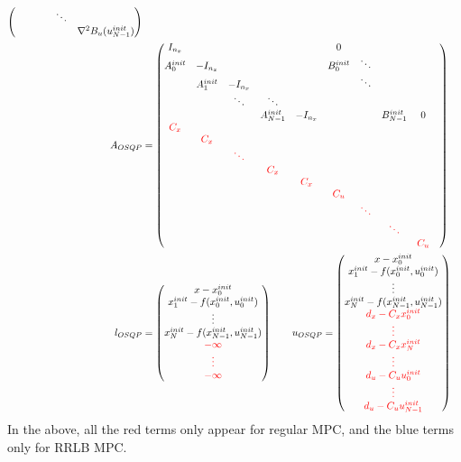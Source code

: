 \documentclass[12pt]{article}
\begin{document}
\begin{align*}
\begin{split}
\begin{pmatrix}
			&&&&\ddots&\\
			&&&&&\nabla^2B_u(u_{N-1}^{init})
		\end{pmatrix}\color{black}\\
		A_{OSQP}&=\begin{pmatrix}
			I_{n_x}&&&&&0&&&&\\
			A_{0}^{init}&-I_{n_x}&&&&B_{0}^{init}&\ddots&&\\
			&A_{1}^{init}&-I_{n_x}&&&&\ddots&&\\
			&&\ddots&\ddots&&&&&\\
			&&&A_{N-1}^{init}&-I_{n_x}&&&B_{N-1}^{init}&0\\
			\color{red}C_x&&&&&&&&\\
			&\color{red}C_x&&&&&&&\\
			&&\color{red}\ddots&&&&&&\\
			&&&\color{red}C_x&&&&&\\
			&&&&\color{red}C_x&&&&\\
			&&&&&\color{red}C_u&&&\\
			&&&&&&\color{red}\ddots&&\\
			&&&&&&&\color{red}\ddots&\\
			&&&&&&&&\color{red}C_u
		\end{pmatrix}\\
		l_{OSQP}&=\begin{pmatrix}
			x-x_0^{init}\\x_{1}^{init}-f(x_0^{init},u_0^{init})\\\vdots\\x_{N}^{init}-f(x_{N-1}^{init},u_{N-1}^{init})\\\color{red}-\infty\\\color{red}\vdots\\\color{red}-\infty
		\end{pmatrix}\qquad u_{OSQP}=\begin{pmatrix}
			x-x_0^{init}\\x_{1}^{init}-f(x_0^{init},u_0^{init})\\\vdots\\x_{N}^{init}-f(x_{N-1}^{init},u_{N-1}^{init})\\\color{red}d_x-C_xx_0^{init}\\\color{red}\vdots\\\color{red}d_x-C_xx_N^{init}\\\color{red}\vdots\\\color{red}d_u-C_uu_{0}^{init}\\\color{red}\vdots\\\color{red}d_u-C_uu_{N-1}^{init}
		\end{pmatrix}
	\end{split}
\end{align*}
\normalsize
In the above, all the red terms only appear for regular MPC, and the blue terms only for RRLB MPC.
\end{document}
